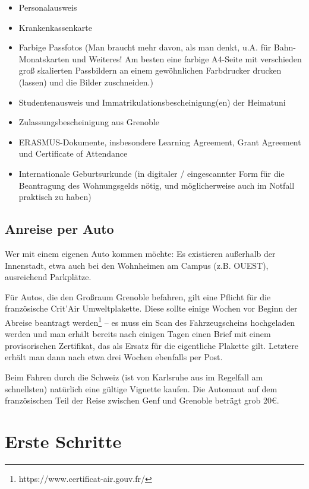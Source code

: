 \documentclass[11pt,a4paper]{article}
\begin{document}
	\begin{itemize}
		\item Personalausweis
		\item Krankenkassenkarte
		\item Farbige Passfotos (Man braucht mehr davon, als man denkt, u.A. für Bahn-Monatskarten und Weiteres! Am besten eine farbige A4-Seite mit verschieden groß skalierten Passbildern an einem gewöhnlichen Farbdrucker drucken (lassen) und die Bilder zuschneiden.)
		\item Studentenausweis und Immatrikulationsbescheinigung(en) der Heimatuni
		\item Zulassungsbescheinigung aus Grenoble
		\item ERASMUS-Dokumente, insbesondere Learning Agreement, Grant Agreement und Certificate of Attendance
		\item Internationale Geburtsurkunde (in digitaler / eingescannter Form für die Beantragung des Wohnungsgelds nötig, und möglicherweise auch im Notfall praktisch zu haben)
	\end{itemize}

	\subsection{Anreise per Auto}
	
	Wer mit einem eigenen Auto kommen möchte: Es existieren außerhalb der Innenstadt, etwa auch bei den Wohnheimen am Campus (z.B. OUEST), ausreichend Parkplätze. 
	
	Für Autos, die den Großraum Grenoble befahren, gilt eine Pflicht für die französische Crit'Air Umweltplakette. Diese sollte einige Wochen vor Beginn der Abreise beantragt werden\footnote{https://www.certificat-air.gouv.fr/} -- es muss ein Scan des Fahrzeugscheins hochgeladen werden und man erhält bereits nach einigen Tagen einen Brief mit einem provisorischen Zertifikat, das als Ersatz für die eigentliche Plakette gilt. Letztere erhält man dann nach etwa drei Wochen ebenfalls per Post.
	
	Beim Fahren durch die Schweiz (ist von Karlsruhe aus im Regelfall am schnellsten) natürlich eine gültige Vignette kaufen. Die Automaut auf dem französischen Teil der Reise zwischen Genf und Grenoble beträgt grob 20€.
		
	\newpage
	\section{Erste Schritte}
	
\end{document}
